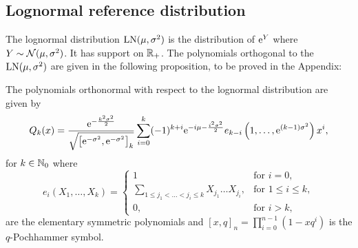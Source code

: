 

\subsection{Lognormal reference distribution}\label{SS:LogNNu}
The lognormal distribution $\mathrm{LN}(\mu, \sigma^2)$ is the distribution of $\mathrm{e}^Y$ where $Y \sim \mathcal{N}(\mu, \sigma^2)$. It has support on $\mathbb{R}_+$. The polynomials orthogonal to the $\mathrm{LN}(\mu, \sigma^2)$ are given in the following proposition, to be proved in the Appendix:

\begin{theorem}\label{LogNormalOrthogonalPolynomialProposition}
The polynomials orthonormal with respect to the lognormal distribution are given by
\begin{equation}\label{eq:OrthonormalPolynomialLogNormalExpression}
Q_{k}(x)=\frac{\mathrm{e}^{-\frac{k^{2}\sigma^{2}}{2}}}{\sqrt{\left[\mathrm{e}^{-\sigma^{2}},\mathrm{e}^{-\sigma^{2}}\right]_{k}}}\sum_{i=0}^{k}(-1)^{k+i}\mathrm{e}^{-i\mu-\frac{i^{2}\sigma^{2}}{2}}e_{k-i}\left(1,\ldots,\mathrm{e}^{(k-1)\sigma^{2}}\right)x^{i},
\end{equation}
for $k\in\mathbb{N}_0$ where
\begin{equation}\label{eq:ElementarySymmetricPolynomial}
e_{i}\left(X_{1},\ldots,X_{k}\right)=
\begin{cases}
1 &\mbox{for } i = 0, \\
\sum_{1\leq j_{1}<\ldots<j_{i}\leq k}X_{j_{1}}\ldots X_{j_{i}}, &\mbox{for } 1 \leq i\leq k, \\
0,& \mbox{for } i>k,
\end{cases}
\end{equation}
are the elementary symmetric polynomials and $\left[x,q\right]_{n}=\prod_{i=0}^{n-1}\left(1-xq^{i}\right)$ is the $q$-Pochhammer symbol.
\end{theorem}


